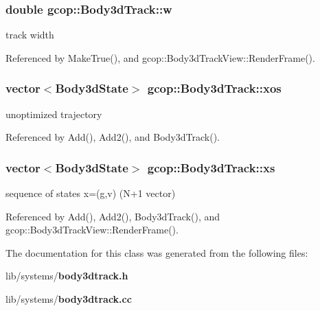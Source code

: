 \subsubsection[{w}]{\setlength{\rightskip}{0pt plus 5cm}double {\bf gcop\-::\-Body3d\-Track\-::w}}\label{classgcop_1_1Body3dTrack_a1a5f923cbe3d6e1b0ff5cb1d9af0bd96}


track width 



\-Referenced by \-Make\-True(), and gcop\-::\-Body3d\-Track\-View\-::\-Render\-Frame().

\subsubsection[{xos}]{\setlength{\rightskip}{0pt plus 5cm}vector$<${\bf \-Body3d\-State}$>$ {\bf gcop\-::\-Body3d\-Track\-::xos}}\label{classgcop_1_1Body3dTrack_aafa75be70bfea60e1dc7841e53cd2403}


unoptimized trajectory 



\-Referenced by \-Add(), \-Add2(), and \-Body3d\-Track().

\subsubsection[{xs}]{\setlength{\rightskip}{0pt plus 5cm}vector$<${\bf \-Body3d\-State}$>$ {\bf gcop\-::\-Body3d\-Track\-::xs}}\label{classgcop_1_1Body3dTrack_a0c9efae40ef6d9d7ea62b98987019bbd}


sequence of states x=(g,v) (\-N+1 vector) 



\-Referenced by \-Add(), \-Add2(), \-Body3d\-Track(), and gcop\-::\-Body3d\-Track\-View\-::\-Render\-Frame().



\-The documentation for this class was generated from the following files\-:\begin{DoxyCompactItemize}
\item 
lib/systems/{\bf body3dtrack.\-h}\item 
lib/systems/{\bf body3dtrack.\-cc}\end{DoxyCompactItemize}
